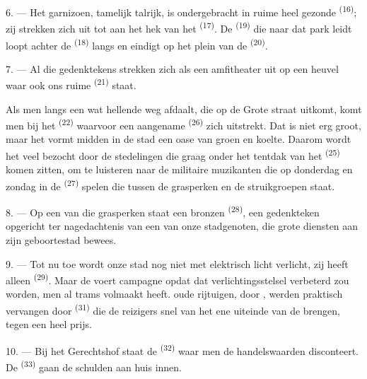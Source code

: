 \VUsaut{5.0mm}
\VUsaut{3.4mm}

6. --- Het garnizoen, tamelijk talrijk, is ondergebracht in ruime heel gezonde
 \textsuperscript{(16)}; zij strekken zich uit tot aan het hek
van het  \textsuperscript{(17)}. De 
\textsuperscript{(19)} die naar dat park leidt loopt achter de
 \textsuperscript{(18)} langs en eindigt op het plein van de
 \textsuperscript{(20)}.

7. --- Al die gedenktekens strekken zich als een amfitheater uit op een heuvel waar ook ons
ruime  \textsuperscript{(21)} staat.

Als men langs een wat hellende weg afdaalt, die op de Grote straat uitkomt, komt men bij het
 \textsuperscript{(22)} waarvoor een aangename
 \textsuperscript{(26)} zich uitstrekt. Dat
 is niet erg groot, maar het vormt midden in de stad een oase
van groen en koelte. Daarom wordt het veel bezocht door de stedelingen die graag onder het
tentdak van het  \textsuperscript{(25)} komen zitten, om te luisteren naar de
militaire muzikanten die op donderdag en zondag in de
 \textsuperscript{(27)} spelen die tussen de grasperken en de
struikgroepen staat.

8. --- Op een van die grasperken staat een bronzen  \textsuperscript{(28)},
een gedenkteken opgericht ter nagedachtenis van een van onze stadgenoten, die grote diensten
aan zijn geboortestad bewees.

\VUsaut{4.0mm}
\VUsaut{3.4mm}

9. --- Tot nu toe wordt onze stad nog niet met elektrisch licht verlicht, zij heeft alleen
 \textsuperscript{(29)}. Maar de
 voert campagne opdat dat verlichtingsstelsel verbeterd
zou worden,  men al  trams volmaakt heeft.
 oude rijtuigen,  door
, werden praktisch vervangen door 
\textsuperscript{(31)} die de reizigers snel van het ene uiteinde van de
 brengen, tegen een heel  prijs.

10. --- Bij het Gerechtshof staat de  \textsuperscript{(32)} waar men de
handelswaarden disconteert. De  \textsuperscript{(33)} gaan de schulden
aan huis innen.

